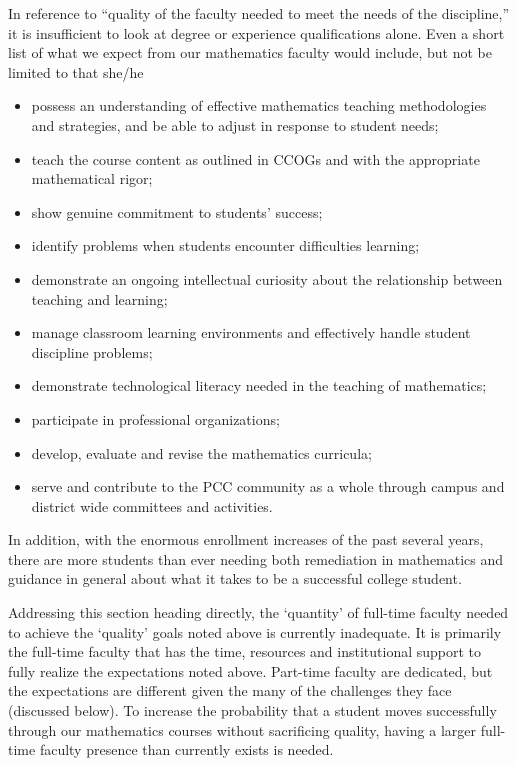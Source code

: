 In reference to ``quality of the faculty needed to meet the needs of the discipline,''  it is insufficient to look at degree or experience qualifications alone.  Even a short list of what we expect from our mathematics faculty would include, but not be limited to that she/he
\begin{itemize}
  \item possess an understanding of effective mathematics teaching methodologies and      strategies, and be able to adjust in response to student needs;
  \item  teach  the course content as outlined in CCOGs and with the appropriate mathematical  rigor;
\item show genuine commitment to students' success;
\item identify problems when students encounter difficulties learning;
\item demonstrate an ongoing intellectual curiosity about the relationship
  between teaching and learning;
\item manage classroom learning environments and effectively handle student
  discipline problems;
\item demonstrate technological literacy needed in the teaching of mathematics;
\item participate in professional organizations;
\item develop, evaluate and revise the mathematics curricula;
\item serve and contribute to the PCC community as a whole through campus and
  district wide committees and activities.
\end{itemize}
In addition, with the enormous enrollment increases of the past several years,
there are more students than ever needing both remediation in mathematics and
guidance in general about what it takes to be a successful college student.

Addressing this section heading directly, the `quantity' of full-time faculty
needed to achieve the `quality' goals noted above is currently inadequate.  It
is primarily the full-time faculty that has the time, resources and
institutional support to fully realize the expectations noted above.  Part-time
faculty are dedicated, but the expectations are different given the
many of the challenges they face (discussed below).   To increase the probability that a student moves successfully
through our mathematics courses without sacrificing quality, having a larger
full-time faculty presence than currently exists is needed.


